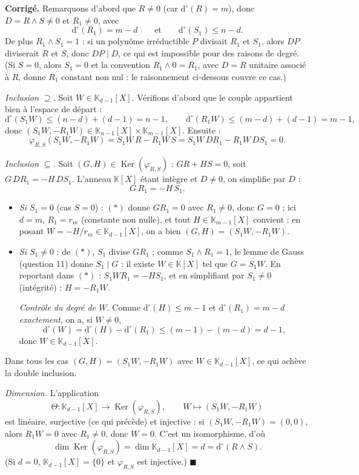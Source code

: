 \documentclass[11pt,a4paper]{article}
\newenvironment{corrige}
  {\par\medskip\noindent
   \begin{tcolorbox}[blanker, breakable,
     borderline west={2.5pt}{0pt}{vertP},
     left=10pt, top=2pt, bottom=2pt]
   {\color{vertP}\bfseries Corrigé.}\hspace{0.5em}\ignorespaces}
  {\hfill$\blacksquare$\end{tcolorbox}\medskip}
\newcommand{\K}{\mathbb{K}}
\newcommand{\dg}[1]{\mathrm{d}^{\circ}\!\left(#1\right)}
\DeclareMathOperator{\Ker}{Ker}
\begin{document}
\begin{corrige}
Remarquons d'abord que $R\neq 0$ (car $\dg{R}=m$), donc
$D=R\wedge S\neq 0$ et $R_1\neq 0$, avec
\[
\dg{R_1}=m-d\qquad\text{et}\qquad \dg{S_1}\le n-d .
\]
De plus $R_1\wedge S_1=1$ : si un polynôme irréductible $P$ divisait
$R_1$ et $S_1$, alors $DP$ diviserait $R$ et $S$, donc $DP\mid D$,
ce qui est impossible pour des raisons de degré. (Si $S=0$, alors
$S_1=0$ et la convention $R_1\wedge 0=R_1$, avec $D=R$ unitaire
associé à $R$, donne $R_1$ constant non nul : le raisonnement
ci-dessous couvre ce cas.)

\emph{Inclusion $\supseteq$.} Soit $W\in\K_{d-1}[X]$. Vérifions
d'abord que le couple appartient bien à l'espace de départ :
\[
\dg{S_1W}\le (n-d)+(d-1)=n-1,
\qquad
\dg{R_1W}\le (m-d)+(d-1)=m-1 ,
\]
donc $(S_1W,-R_1W)\in\K_{n-1}[X]\times\K_{m-1}[X]$. Ensuite :
\[
\varphi_{R,S}(S_1W,-R_1W)
=S_1W\,R-R_1W\,S
=S_1W\,DR_1-R_1W\,DS_1
=0 .
\]

\emph{Inclusion $\subseteq$.} Soit
$(G,H)\in\Ker(\varphi_{R,S})$ : $GR+HS=0$, soit
$G\,DR_1=-H\,DS_1$. L'anneau $\K[X]$ étant intègre et $D\neq 0$, on
simplifie par $D$ :
\[
G\,R_1=-H\,S_1 . \tag{$*$}
\]
\begin{itemize}[leftmargin=1.6em, itemsep=1pt]
\item \emph{Si $S_1=0$} (cas $S=0$) : $(*)$ donne $GR_1=0$ avec
$R_1\neq 0$, donc $G=0$ ; ici $d=m$, $R_1=r_m$ (constante non
nulle), et tout $H\in\K_{m-1}[X]$ convient : en posant
$W=-H/r_m\in\K_{d-1}[X]$, on a bien $(G,H)=(S_1W,-R_1W)$.
\item \emph{Si $S_1\neq 0$} : de $(*)$, $S_1$ divise $G R_1$ ; comme
$S_1\wedge R_1=1$, le lemme de Gauss (question 11) donne
$S_1\mid G$ : il existe $W\in\K[X]$ tel que $G=S_1W$. En reportant
dans $(*)$ : $S_1WR_1=-HS_1$, et en simplifiant par $S_1\neq 0$
(intégrité) : $H=-R_1W$.

\emph{Contrôle du degré de $W$.} Comme $\dg{H}\le m-1$ et
$\dg{R_1}=m-d$ \emph{exactement}, on a, si $W\neq 0$,
\[
\dg{W}=\dg{H}-\dg{R_1}\le (m-1)-(m-d)=d-1,
\]
donc $W\in\K_{d-1}[X]$.
\end{itemize}
Dans tous les cas $(G,H)=(S_1W,-R_1W)$ avec $W\in\K_{d-1}[X]$, ce
qui achève la double inclusion.

\emph{Dimension.} L'application
\[
\Theta:\K_{d-1}[X]\longrightarrow\Ker(\varphi_{R,S}),
\qquad W\longmapsto(S_1W,-R_1W)
\]
est linéaire, surjective (ce qui précède) et injective : si
$(S_1W,-R_1W)=(0,0)$, alors $R_1W=0$ avec $R_1\neq 0$, donc $W=0$.
C'est un isomorphisme, d'où
\[
\boxed{\ \dim\Ker(\varphi_{R,S})=\dim\K_{d-1}[X]=d
=\dg{R\wedge S}.\ }
\]
(Si $d=0$, $\K_{d-1}[X]=\{0\}$ et $\varphi_{R,S}$ est injective.)
\end{corrige}
\end{document}
